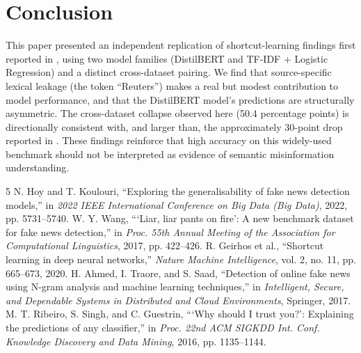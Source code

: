 \documentclass[conference]{IEEEtran}
\begin{document}
\section{Conclusion}
This paper presented an independent replication of shortcut-learning findings first reported in \cite{hoy2022}, using two model families (DistilBERT and TF-IDF + Logistic Regression) and a distinct cross-dataset pairing. We find that source-specific lexical leakage (the token ``Reuters'') makes a real but modest contribution to model performance, and that the DistilBERT model's predictions are structurally asymmetric. The cross-dataset collapse observed here (50.4 percentage points) is directionally consistent with, and larger than, the approximately 30-point drop reported in \cite{hoy2022}. These findings reinforce that high accuracy on this widely-used benchmark should not be interpreted as evidence of semantic misinformation understanding.

\begin{thebibliography}{5}
 N. Hoy and T. Koulouri, ``Exploring the generalisability of fake news detection models,'' in \emph{2022 IEEE International Conference on Big Data (Big Data)}, 2022, pp. 5731--5740.
 W. Y. Wang, ```Liar, liar pants on fire': A new benchmark dataset for fake news detection,'' in \emph{Proc. 55th Annual Meeting of the Association for Computational Linguistics}, 2017, pp. 422--426.
 R. Geirhos et al., ``Shortcut learning in deep neural networks,'' \emph{Nature Machine Intelligence}, vol. 2, no. 11, pp. 665--673, 2020.
 H. Ahmed, I. Traore, and S. Saad, ``Detection of online fake news using N-gram analysis and machine learning techniques,'' in \emph{Intelligent, Secure, and Dependable Systems in Distributed and Cloud Environments}, Springer, 2017.
 M. T. Ribeiro, S. Singh, and C. Guestrin, ```Why should I trust you?': Explaining the predictions of any classifier,'' in \emph{Proc. 22nd ACM SIGKDD Int. Conf. Knowledge Discovery and Data Mining}, 2016, pp. 1135--1144.
\end{thebibliography}
\end{document}
